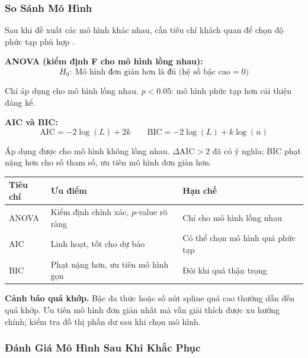 \subsubsection{So Sánh Mô Hình}

Sau khi đề xuất các mô hình khác nhau, cần tiêu chí khách quan để chọn độ phức tạp phù hợp \cite[Sec.~10.2, pp.~238--239, 247]{weisberg2014applied}.

\textbf{ANOVA (kiểm định F cho mô hình lồng nhau):}
\[
  H_0{:}\ \text{Mô hình đơn giản hơn là đủ (hệ số bậc cao} = 0\text{)}
\]

Chỉ áp dụng cho mô hình lồng nhau. $p < 0.05$: mô hình phức tạp hơn cải thiện đáng kể.

\textbf{AIC và BIC:}
\[
  \text{AIC} = -2\log(L) + 2k
  \qquad
  \text{BIC} = -2\log(L) + k\log(n)
\]

Áp dụng được cho mô hình không lồng nhau. $\Delta\text{AIC} > 2$ đã có ý nghĩa; BIC phạt nặng hơn cho số tham số, ưu tiên mô hình đơn giản hơn.

\begin{center}
\small
\begin{tabularx}{\textwidth}{@{}l>{\raggedright\arraybackslash}X>{\raggedright\arraybackslash}X@{}}
\toprule
\textbf{Tiêu chí} & \textbf{Ưu điểm} & \textbf{Hạn chế} \\
\midrule
ANOVA & Kiểm định chính xác, $p$-value rõ ràng & Chỉ cho mô hình lồng nhau \\
AIC   & Linh hoạt, tốt cho dự báo              & Có thể chọn mô hình quá phức tạp \\
BIC   & Phạt nặng hơn, ưu tiên mô hình gọn     & Đôi khi quá thận trọng \\
\bottomrule
\end{tabularx}
\end{center}

\textbf{Cảnh báo quá khớp.} Bậc đa thức hoặc số nút spline quá cao thường dẫn đến quá khớp. Ưu tiên mô hình đơn giản nhất mà vẫn giải thích được xu hướng chính; kiểm tra đồ thị phần dư sau khi chọn mô hình.

\subsubsection{Đánh Giá Mô Hình Sau Khi Khắc Phục}

